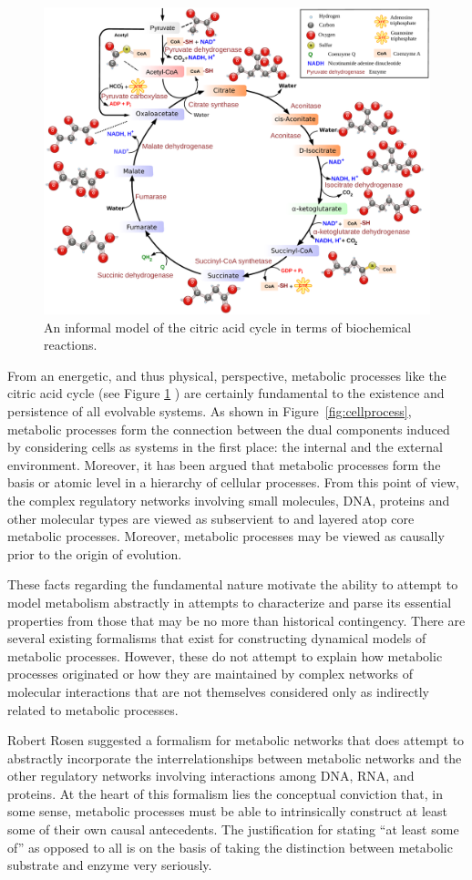 \documentclass[10pt]{article}
\begin{document}
\begin{figure}
\begin{center}
\noindent\includegraphics[width=0.5\columnwidth]{fig/Citric_acid_cycle.pdf}
\end{center}
\caption{An informal model of the citric acid cycle in terms of biochemical reactions.}
\label{fig:ctacyc}
\end{figure}
From an energetic, and thus physical, perspective, metabolic processes like the citric acid cycle (see Figure \ref{fig:ctacyc} ) are certainly fundamental to the existence and persistence of all evolvable systems. As shown in Figure~\ref{fig:cellprocess}, metabolic processes form the connection between the dual components induced by considering cells as systems in the first place: the internal and the external environment. Moreover, it has been argued that metabolic processes form the basis or atomic level in a hierarchy of cellular processes. From this point of view, the complex regulatory networks involving small molecules, DNA, proteins and other molecular types are viewed as subservient to and layered atop core metabolic processes. Moreover, metabolic processes may be viewed as causally prior to the origin of evolution.

These facts regarding the fundamental nature motivate the ability to attempt to model metabolism abstractly in attempts to characterize and parse its essential properties from those that may be no more than historical contingency. There are several existing formalisms that exist for constructing dynamical models of metabolic processes. However, these do not attempt to explain how metabolic processes originated or how they are maintained by complex networks of molecular interactions that are not themselves considered only as indirectly related to metabolic processes.

Robert Rosen suggested a formalism for metabolic networks that does attempt to abstractly incorporate the interrelationships between metabolic networks and the other regulatory networks involving interactions among DNA, RNA, and proteins. At the heart of this formalism lies the conceptual conviction that, in some sense, metabolic processes must be able to intrinsically construct at least some of their own causal antecedents. The justification for stating ``at least some of'' as opposed to all is on the basis of taking the distinction between metabolic substrate and enzyme very seriously.
\end{document}
